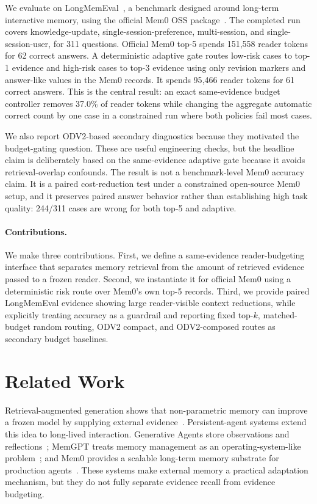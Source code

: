 \documentclass{article}
\begin{document}
We evaluate on LongMemEval~\cite{wu2025longmemeval}, a benchmark designed around long-term interactive memory, using the official Mem0 OSS package~\cite{chhikara2025mem0}. The completed run covers knowledge-update, single-session-preference, multi-session, and single-session-user, for 311 questions. Official Mem0 top-5 spends 151{,}558 reader tokens for 62 correct answers. A deterministic adaptive gate routes low-risk cases to top-1 evidence and high-risk cases to top-3 evidence using only revision markers and answer-like values in the Mem0 records. It spends 95{,}466 reader tokens for 61 correct answers. This is the central result: an exact same-evidence budget controller removes 37.0\% of reader tokens while changing the aggregate automatic correct count by one case in a constrained run where both policies fail most cases.

We also report ODV2-based secondary diagnostics because they motivated the budget-gating question. These are useful engineering checks, but the headline claim is deliberately based on the same-evidence adaptive gate because it avoids retrieval-overlap confounds. The result is not a benchmark-level Mem0 accuracy claim. It is a paired cost-reduction test under a constrained open-source Mem0 setup, and it preserves paired answer behavior rather than establishing high task quality: 244/311 cases are wrong for both top-5 and adaptive.

\paragraph{Contributions.}
We make three contributions. First, we define a same-evidence reader-budgeting interface that separates memory retrieval from the amount of retrieved evidence passed to a frozen reader. Second, we instantiate it for official Mem0 using a deterministic risk route over Mem0's own top-5 records. Third, we provide paired LongMemEval evidence showing large reader-visible context reductions, while explicitly treating accuracy as a guardrail and reporting fixed top-$k$, matched-budget random routing, ODV2 compact, and ODV2-composed routes as secondary budget baselines.

\section{Related Work}

Retrieval-augmented generation shows that non-parametric memory can improve a frozen model by supplying external evidence~\cite{lewis2020rag}. Persistent-agent systems extend this idea to long-lived interaction. Generative Agents store observations and reflections~\cite{park2023generative}; MemGPT treats memory management as an operating-system-like problem~\cite{packer2023memgpt}; and Mem0 provides a scalable long-term memory substrate for production agents~\cite{chhikara2025mem0}. These systems make external memory a practical adaptation mechanism, but they do not fully separate evidence recall from evidence budgeting.
\end{document}
